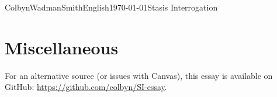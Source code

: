\documentclass[american, 12pt]{article}
\begin{document}
\begin{mla}{Colbyn}{Wadman}{Smith}{English}{\today}{Stasis Interrogation}






\section*{Miscellaneous}

\begin{center}
For an alternative source (or issues with Canvas), this essay is available on GitHub: \url{https://github.com/colbyn/SI-essay}.
\end{center}






\end{mla}
\end{document}
